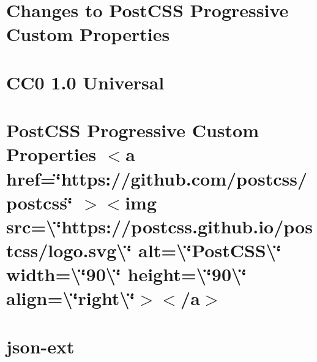 \documentclass[twoside]{book}
\newcommand{\+}{\discretionary{\mbox{\scriptsize$\hookleftarrow$}}{}{}}
\begin{document}
\chapter{Changes to Post\+CSS Progressive Custom Properties}
\label{md__c___users_vaishnavi_jadhav__desktop__developer_code_mean_stack_example_client_node_modules__c589c8974e0b3060d117721ba1fd2ea7}

\chapter{CC0 1.0 Universal}
\label{md__c___users_vaishnavi_jadhav__desktop__developer_code_mean_stack_example_client_node_modules__345f44e7c3d74493e2d4df3e37d47bfb}

\chapter{Post\+CSS Progressive Custom Properties \texorpdfstring{$<$}{<}a href=\char`\"{}https\+://github.\+com/postcss/postcss\char`\"{} \texorpdfstring{$>$}{>}\texorpdfstring{$<$}{<}img src=\textbackslash{}\char`\"{}https\+://postcss.\+github.\+io/postcss/logo.\+svg\textbackslash{}\char`\"{} alt=\textbackslash{}\char`\"{}\+Post\+CSS\textbackslash{}\char`\"{} width=\textbackslash{}\char`\"{}90\textbackslash{}\char`\"{} height=\textbackslash{}\char`\"{}90\textbackslash{}\char`\"{} align=\textbackslash{}\char`\"{}right\textbackslash{}\char`\"{}\texorpdfstring{$>$}{>}\texorpdfstring{$<$}{<}/a\texorpdfstring{$>$}{>}}
\label{md__c___users_vaishnavi_jadhav__desktop__developer_code_mean_stack_example_client_node_modules__16ab359e0f34459134edb116bdde086b}

\chapter{json-\/ext}
\label{md__c___users_vaishnavi_jadhav__desktop__developer_code_mean_stack_example_client_node_modules__866f4e73cf2607366e4fd27d67bf180c}

\end{document}
